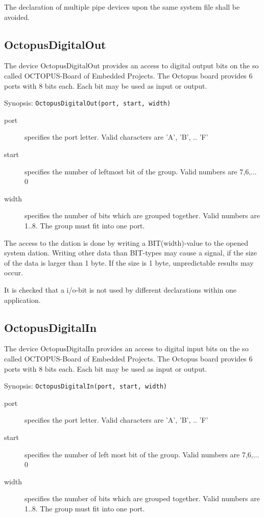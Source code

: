 The declaration of multiple pipe devices upon the same system file shall
be avoided.
 
\subsection{OctopusDigitalOut}
The device OctopusDigitalOut provides an access to digital output bits
on the so called OCTOPUS-Board of Embedded Projects.
The Octopus board provides 6 ports with 8 bits each. Each bit may be
used as input or output.

Synopsis: \verb|OctopusDigitalOut(port, start, width)|

\begin{description}
\item [port] specifies the port letter. Valid characters are 'A', 'B', .. 'F'
\item[start] specifies the number of leftmost bit of the group. Valid numbers
     are 7,6,... 0
\item [width] specifies the number of bits which are grouped together.
     Valid numbers are 1..8.
     The group must fit into one port.
\end{description}

The access to the dation is done by writing a BIT(width)-value to the
opened system dation. 
Writing other data than BIT-types  may cause a signal, if the size of the
data is larger than 1 byte. If the size is 1 byte, unpredictable results may
occur.

It is checked that a i/o-bit is not used by different declarations within
one application.
  
\subsection{OctopusDigitalIn}
The device OctopusDigitalIn provides an access to digital input bits
on the so called OCTOPUS-Board of Embedded Projects.
The Octopus board provides 6 ports with 8 bits each. Each bit may be
used as input or output.

Synopsis: \verb|OctopusDigitalIn(port, start, width)|

\begin{description}
\item [port] specifies the port letter. Valid characters are 'A', 'B', .. 'F'
\item[start] specifies the number of left most bit of the group. Valid numbers
     are 7,6,... 0
\item [width] specifies the number of bits which are grouped together.
     Valid numbers are 1..8.
     The group must fit into one port.
\end{description}

